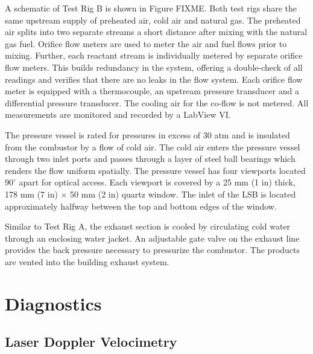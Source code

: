 A schematic of Test Rig B is shown in Figure FIXME.
Both test rigs share the same upstream supply of preheated air, cold air and natural gas.
The preheated air splits into two separate streams a short distance after mixing with the natural gas fuel.
Orifice flow meters are used to meter the air and fuel flows prior to mixing.
Further, each reactant stream is individually metered by separate orifice flow meters.
This builds redundancy in the system, offering a double-check of all readings and verifies that there are no leaks in the flow system.
Each orifice flow meter is equipped with a thermocouple, an upstream pressure transducer and a differential pressure transducer.
The cooling air for the co-flow is not metered.
All measurements are monitored and recorded by a LabView VI.

The pressure vessel is rated for pressures in excess of 30 atm and is insulated from the combustor by a flow of cold air.
The cold air enters the pressure vessel through two inlet ports and passes through a layer of steel ball bearings which renders the flow uniform spatially.
The pressure vessel has four viewports located \(90^\circ\) apart for optical access.
Each viewport is covered by a 25 mm (1 in) thick, 178 mm (7 in) \(\times\) 50 mm (2 in) quartz window.
The inlet of the LSB is located approximately halfway between the top and bottom edges of the window.

Similar to Test Rig A, the exhaust section is cooled by circulating cold water through an enclosing water jacket.
An adjustable gate valve on the exhaust line provides the back pressure necessary to pressurize the combustor.
The products are vented into the building exhaust system.

\section{Diagnostics}

\subsection{Laser Doppler Velocimetry}


